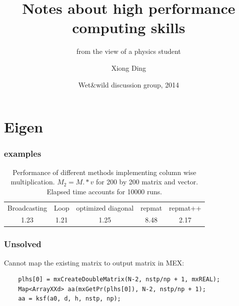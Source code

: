 \documentclass[mathserif, handout]{beamer}
\title[Notes about HPC] %
{Notes about high performance computing skills}
\subtitle{from the view of a physics student}
\author[Xiong, Predrag] %
{Xiong Ding\inst{1}}
\institute[Gatech] %
{
  \inst{1}%
  School of Physics\\
  Georgia Institute of Technology
}
\date[Wet\&wild 2014] %
{Wet\&wild discussion group, 2014}
\begin{document}
\frame{\titlepage} %

\section{Eigen}

\begin{frame}
  \frametitle{examples}
\begin{table}[h]
  \centering
  \begin{tabular}{c c c c c}
    Broadcasting & Loop & optimized diagonal & repmat & repmat++\\
    1.23 & 1.21 & 1.25 & 8.48  & 2.17 \\
  \end{tabular}
  \caption{Performance of different methods implementing column wise
    multiplication. $M_2 = M.*v$ for 200 by 200 matrix and vector. 
    Elapsed time accounts for 10000 runs.}
\end{table}
\end{frame}

\begin{frame}[fragile]
  \frametitle{Unsolved}
  
  Cannot map the existing matrix to output matrix in MEX:
\begin{verbatim}
    plhs[0] = mxCreateDoubleMatrix(N-2, nstp/np + 1, mxREAL);
    Map<ArrayXXd> aa(mxGetPr(plhs[0]), N-2, nstp/np + 1);
    aa = ksf(a0, d, h, nstp, np);
\end{verbatim}
 
\end{frame}
\end{document}
